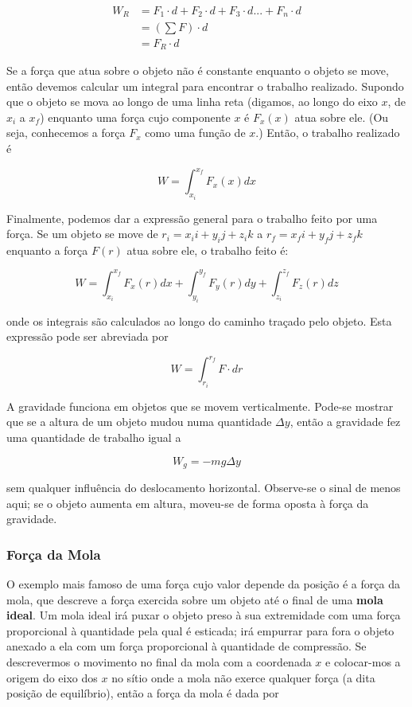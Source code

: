 $$
\begin{aligned}
    W_{R}&=F_1\cdot d+F_2\cdot d+F_3\cdot d...+F_n\cdot d\\
    &=(\sum F)\cdot d \\
    &=F_{R}\cdot d
\end{aligned}
$$

Se a força que atua sobre o objeto não é constante enquanto o objeto se move, então devemos calcular um integral para encontrar o trabalho realizado.
Supondo que o objeto se mova ao longo de uma linha reta (digamos, ao longo do eixo $x$, de $x_i$ a $x_f$) enquanto
uma força cujo componente $x$ é $F_x(x)$ atua sobre ele. (Ou seja, conhecemos a força $F_x$ como uma função
de $x$.) Então, o trabalho realizado é

\begin{equation}\label{eq:trabalho}
    W=\int_{x_i}^{x_f}F_x(x)dx
\end{equation}

Finalmente, podemos dar a expressão general para o trabalho feito por uma força. Se um objeto se move de $r_i=x_ii+y_ij+z_ik$ a $r_f=x_fi+y_fj+z_fk$ enquanto a força $F(r)$ atua sobre ele, o trabalho feito é:

\begin{equation}
    W=\int_{x_i}^{x_f}F_x(r)dx+\int_{y_i}^{y_f}F_y(r)dy+\int_{z_i}^{z_f}F_z(r)dz
\end{equation}

onde os integrais são calculados ao longo do caminho traçado pelo objeto. Esta expressão pode ser abreviada por

\begin{equation}
W=\int_{r_i}^{r_f}F\cdot dr
\end{equation}

A gravidade funciona em objetos que se movem verticalmente. Pode-se mostrar que se a altura de um objeto mudou numa quantidade $\Delta y$, então a gravidade fez uma quantidade de trabalho igual a 

\begin{equation}
W_{g}=-mg\Delta y
\end{equation}

sem qualquer influência do deslocamento horizontal. Observe-se o sinal de menos aqui; se o objeto aumenta em altura, moveu-se de forma oposta à força da gravidade.

\subsubsection{Força da Mola}
O exemplo mais famoso de uma força cujo valor depende da posição é a força da mola, que descreve a força exercida sobre um objeto até o final de uma \textbf{mola ideal}. Um mola ideal irá puxar o objeto preso à sua extremidade com uma força proporcional à quantidade pela qual é esticada; irá empurrar para fora o objeto anexado a ela com um força proporcional à quantidade de compressão.
Se descrevermos o movimento no final da mola com a coordenada $x$ e colocar-mos a origem do eixo dos $x$ no sítio onde a mola não exerce qualquer força (a dita posição de equilíbrio), então a força da mola é dada por

